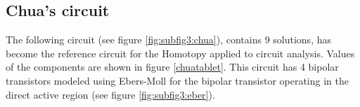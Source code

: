 \documentclass[journal,twocolumn]{IEEEtran}
\begin{document}
\subsection{Chua's circuit}

The following circuit \cite{homo_chua} (see figure \ref{fig:subfig3:chua}), contains 9 solutions, has become the reference circuit for the Homotopy applied to circuit analysis. Values of the components are shown in figure \ref{chuatablet}. This circuit has 4 bipolar transistors modeled using Ebers-Moll for the bipolar transistor operating in the direct active region (see figure \ref{fig:subfig3:eber}).

\begin{table}[hbtp]
\caption{Values of the components for the circuit shown in figure \ref{fig:subfig3:chua}.}
\label{chuatablet}
\end{table}
\end{document}
